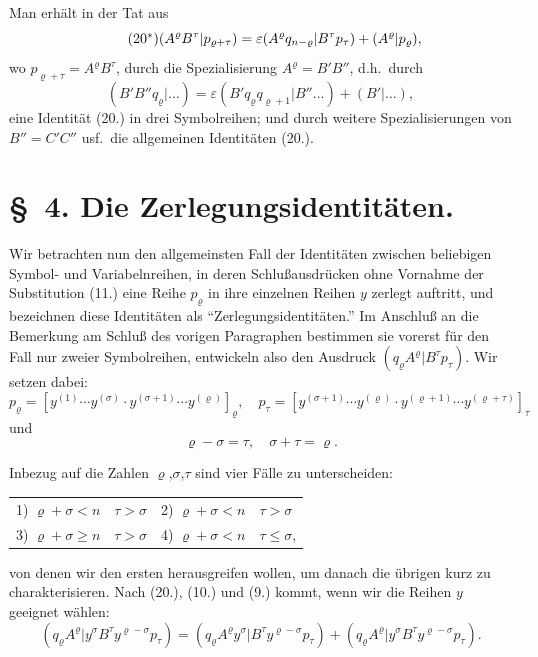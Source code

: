 \documentclass[12pt,a4paper]{article}
\begin{document}
Man erhält in der Tat aus
\begin{equation*}\tag{20$^{*}$}
(A^{\varrho} B^{\tau} | p_{\varrho+\tau}) = \varepsilon (A^{\varrho} q_{n-\varrho} | B^{\tau} p_{\tau}) + (A^{\varrho} | p_{\varrho}),
\end{equation*}
wo $p_{\varrho+\tau} = A^{\varrho} B^{\tau}$, durch die Spezialisierung $A^{\varrho} = B' B''$, d.h.\ durch
\begin{equation*}
(B' B'' q_{\varrho} | \ldots) = \varepsilon (B' q_{\varrho} q_{\varrho+1} | B'' \ldots) + (B' | \ldots),
\end{equation*}
eine Identität (20.) in drei Symbolreihen; und durch weitere Spezialisierungen von $B'' = C' C''$ usf.\ die allgemeinen Identitäten (20.).

\section*{\S\ 4. Die Zerlegungsidentitäten.}

Wir betrachten nun den allgemeinsten Fall der Identitäten zwischen beliebigen Symbol- und Variabelnreihen, in deren Schlußausdrücken ohne Vornahme der Substitution (11.) eine Reihe $p_{\varrho}$ in ihre einzelnen Reihen $y$ zerlegt auftritt, und bezeichnen diese Identitäten als ``Zerlegungsidentitäten.'' Im Anschluß an die Bemerkung am Schluß des vorigen Paragraphen bestimmen sie vorerst für den Fall nur zweier Symbolreihen, entwickeln also den Ausdruck $(q_{\varrho} A^{\varrho} | B^{\tau} p_{\tau})$. Wir setzen dabei:
\begin{equation}\tag{22}
p_{\varrho} = [y^{(1)} \cdots y^{(\sigma)} \cdot y^{(\sigma+1)} \cdots y^{(\varrho)}]_{\varrho}, \quad p_{\tau} = [y^{(\sigma+1)} \cdots y^{(\varrho)} \cdot y^{(\varrho+1)} \cdots y^{(\varrho+\tau)}]_{\tau}
\end{equation}
und
\begin{equation*}
\varrho - \sigma = \tau, \quad \sigma + \tau = \varrho.
\end{equation*}

Inbezug auf die Zahlen $\varrho$,$\sigma$,$\tau$ sind vier Fälle zu unterscheiden:
\begin{center}
\begin{tabular}{ll@{\qquad}ll}
1) $\varrho + \sigma < n$ & $\tau > \sigma$ & 2) $\varrho + \sigma < n$ & $\tau > \sigma$ \\
3) $\varrho + \sigma \geq n$ & $\tau > \sigma$ & 4) $\varrho + \sigma < n$ & $\tau \leq \sigma$,
\end{tabular}
\end{center}
von denen wir den ersten herausgreifen wollen, um danach die übrigen kurz zu charakterisieren. Nach (20.), (10.) und (9.) kommt, wenn wir die Reihen $y$ geeignet wählen:
\begin{equation}\tag{23}
(q_{\varrho} A^{\varrho} | y^{\sigma} B^{\tau} y^{\varrho-\sigma} p_{\tau}) = (q_{\varrho} A^{\varrho} y^{\sigma} | B^{\tau} y^{\varrho-\sigma} p_{\tau}) + (q_{\varrho} A^{\varrho} | y^{\sigma} B^{\tau} y^{\varrho-\sigma} p_{\tau}).
\end{equation}
\end{document}

